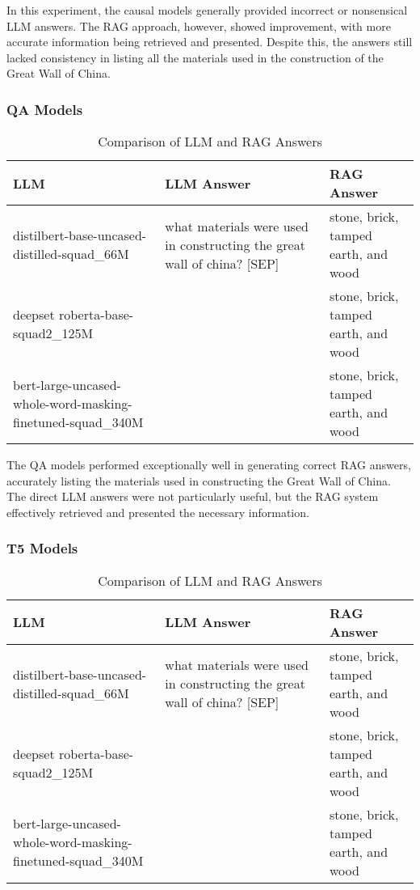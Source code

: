 \documentclass{wseas}
\begin{document}
In this experiment, the causal models generally provided incorrect or
nonsensical LLM answers. The RAG approach, however, showed improvement,
with more accurate information being retrieved and presented. Despite
this, the answers still lacked consistency in listing all the materials
used in the construction of the Great Wall of China.

\subsubsection{QA Models}

\begin{table*}[htbp]
\centering
\caption{Comparison of LLM and RAG Answers} %
\begin{tabular}{p{0.3714\linewidth} p{0.4000\linewidth} p{0.2286\linewidth}}
\toprule
\textbf{LLM} & \textbf{LLM Answer} & \textbf{RAG Answer} \\
\midrule
distilbert-base-uncased-distilled-squad\_66M & what materials were used in constructing the great wall of china? {[}SEP{]} & stone, brick, tamped earth, and wood \\
deepset roberta-base-squad2\_125M & & stone, brick, tamped earth, and wood \\
bert-large-uncased-whole-word-masking-finetuned-squad\_340M & & stone, brick, tamped earth, and wood \\
\bottomrule
\end{tabular}
\end{table*}
  

The QA models performed exceptionally well in generating correct RAG
answers, accurately listing the materials used in constructing the Great
Wall of China. The direct LLM answers were not particularly useful, but
the RAG system effectively retrieved and presented the necessary
information.

\subsubsection{T5 Models}

\begin{table*}[htbp]
\centering
\caption{Comparison of LLM and RAG Answers} %
\begin{tabular}{p{0.3714\linewidth} p{0.4000\linewidth} p{0.2286\linewidth}}
\toprule
\textbf{LLM} & \textbf{LLM Answer} & \textbf{RAG Answer} \\
\midrule
distilbert-base-uncased-distilled-squad\_66M & what materials were used in constructing the great wall of china? {[}SEP{]} & stone, brick, tamped earth, and wood \\
deepset roberta-base-squad2\_125M & & stone, brick, tamped earth, and wood \\
bert-large-uncased-whole-word-masking-finetuned-squad\_340M & & stone, brick, tamped earth, and wood \\
\bottomrule
\end{tabular}
\end{table*}
\end{document}
